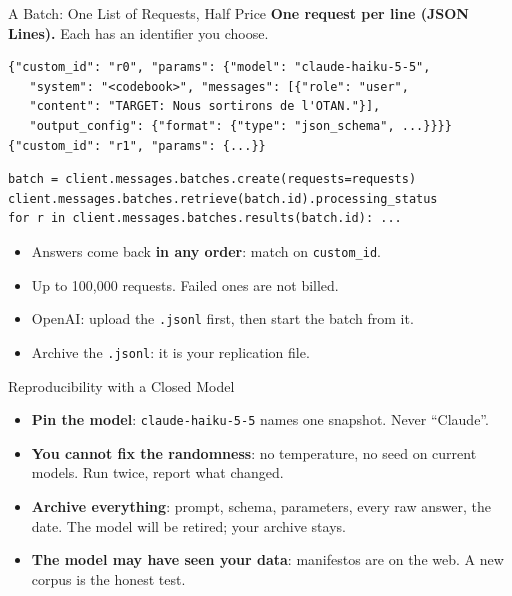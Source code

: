 \documentclass[svgnames,x11names,dvipsnames]{beamer}
\newcommand{\chg}[1]{{\bfseries #1}}
\renewcommand{\chg}[1]{#1}
\begin{document}
\begin{frame}[fragile]{\chg{A Batch: One List of Requests, Half Price}}
\small
\textbf{One request per line (JSON Lines).} Each has an identifier you choose.

\vspace{0.1cm}
{\scriptsize
\begin{verbatim}
{"custom_id": "r0", "params": {"model": "claude-haiku-5-5",
   "system": "<codebook>", "messages": [{"role": "user",
   "content": "TARGET: Nous sortirons de l'OTAN."}],
   "output_config": {"format": {"type": "json_schema", ...}}}}
{"custom_id": "r1", "params": {...}}
\end{verbatim}}

\vspace{0.1cm}
{\scriptsize
\begin{verbatim}
batch = client.messages.batches.create(requests=requests)
client.messages.batches.retrieve(batch.id).processing_status
for r in client.messages.batches.results(batch.id): ...
\end{verbatim}}

\vspace{0.1cm}
\begin{itemize}
    \setlength{\itemsep}{2pt}
    \item Answers come back \textbf{in any order}: match on \texttt{custom\_id}.
    \item Up to 100,000 requests. Failed ones are not billed.
    \item \chg{OpenAI: upload the \texttt{.jsonl} first, then start the batch from it.}
    \item Archive the \texttt{.jsonl}: it is your replication file.
\end{itemize}
\end{frame}

\begin{frame}{Reproducibility with a Closed Model}
\small
\begin{itemize}
    \setlength{\itemsep}{8pt}
    \item \textbf{Pin the model}: \texttt{claude-haiku-5-5} names one snapshot. Never ``Claude''.
    \item \textbf{You cannot fix the randomness}: no temperature, no seed on current models. Run twice, report what changed.
    \item \textbf{Archive everything}: prompt, schema, parameters, every raw answer, the date. The model will be retired; your archive stays.
    \item \textbf{The model may have seen your data}: manifestos are on the web. A new corpus is the honest test.
\end{itemize}
\end{frame}
\end{document}
